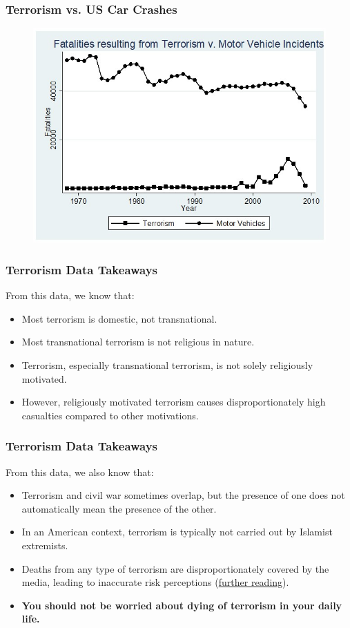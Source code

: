 \documentclass{beamer}
\begin{document}
\begin{frame} 
	\frametitle{\LARGE{Terrorism vs. US Car Crashes}}
	\begin{figure}[ht!]
		\centering
		\includegraphics[width=\textwidth,height=.9\textheight,keepaspectratio]{crashes.jpg}
	\end{figure}
\end{frame}

\begin{frame} 
	\frametitle{\LARGE{Terrorism Data Takeaways}}
	From this data, we know that:
	\begin{itemize}
		\item Most terrorism is domestic, not transnational. \pause
		\item Most transnational terrorism is not religious in nature. \pause
		\item Terrorism, especially transnational terrorism, is not solely religiously motivated. \pause
		\item However, religiously motivated terrorism causes disproportionately high casualties compared to other motivations. 
		
	\end{itemize}
\end{frame}

\begin{frame} 
	\frametitle{\LARGE{Terrorism Data Takeaways}}
From this data, we also know that:
	\begin{itemize}
		\item Terrorism and civil war sometimes overlap, but the presence of one does not automatically mean the presence of the other. \pause
		\item In an American context, terrorism is typically not carried out by Islamist extremists. \pause
		\item Deaths from any type of terrorism are disproportionately covered by the media, leading to inaccurate risk perceptions (\href{https://ourworldindata.org/terrorism}{further reading}). \pause
		\item \textbf{You should not be worried about dying of terrorism in your daily life.}
		
	\end{itemize}
\end{frame}
\end{document}
